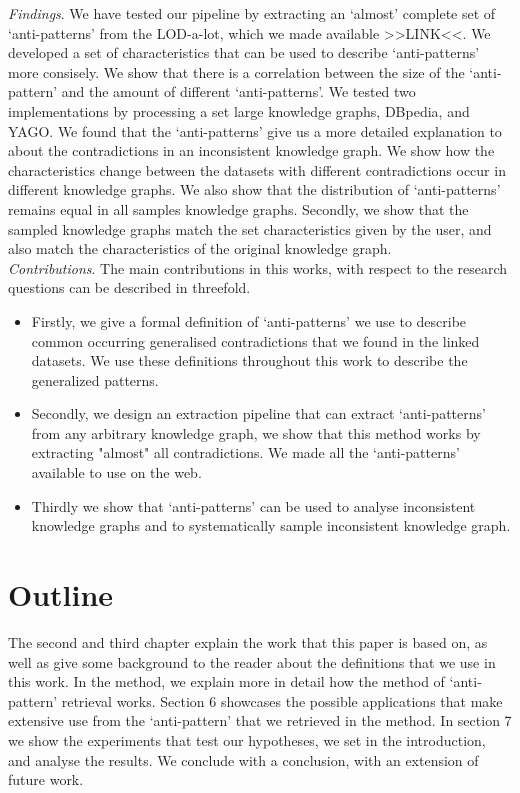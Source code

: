 \documentclass[11pt,letterpaper ,oneside ]{book}
\begin{document}
\textit{Findings}. We have tested our pipeline by extracting an `almost' complete set of `anti-patterns' from the LOD-a-lot\cite{JavierD:2017}, which we made available >>LINK<<. We developed a set of characteristics that can be used to describe `anti-patterns' more consisely. 
We show that there is a correlation between the size of the `anti-pattern' and the amount of different `anti-patterns'. 
We tested two implementations by processing a set large knowledge graphs, DBpedia\cite{DBpedia}, and YAGO\cite{YAGO}.
We found that the `anti-patterns' give us a more detailed explanation to about the contradictions in an inconsistent knowledge graph. 
We show how the characteristics change between the datasets with different contradictions occur in different knowledge graphs. We also show that the  distribution of `anti-patterns' remains equal in all samples knowledge graphs. 
Secondly, we show that the sampled knowledge graphs match the set characteristics given by the user, and also match the characteristics of the original knowledge graph.\\

\textit{Contributions}. 
The main contributions in this works, with respect to the research questions can be described in threefold.
\begin{itemize}
	\item Firstly, we give a formal definition of `anti-patterns' we use to describe common occurring generalised contradictions that we found in the linked datasets. We use these definitions throughout this work to describe the generalized patterns.
	\item Secondly, we design an extraction pipeline that can extract `anti-patterns' from any arbitrary knowledge graph, we show that this method works by extracting "almost" all contradictions. We made all the `anti-patterns' available to use on the web.
	\item Thirdly we show that `anti-patterns' can be used to analyse inconsistent knowledge graphs and to systematically sample inconsistent knowledge graph.
\end{itemize}

\section{Outline}
 The second and third chapter explain the work that this paper is based on, as well as give some background to the reader about the definitions that we use in this work. In the method, we explain more in detail how the method of `anti-pattern' retrieval works. Section 6  showcases the possible applications that make extensive use from the `anti-pattern' that we retrieved in the method. In section 7 we show the experiments that test our hypotheses, we set in the introduction, and analyse the results. We conclude with a conclusion, with an extension of future work.
\end{document}
